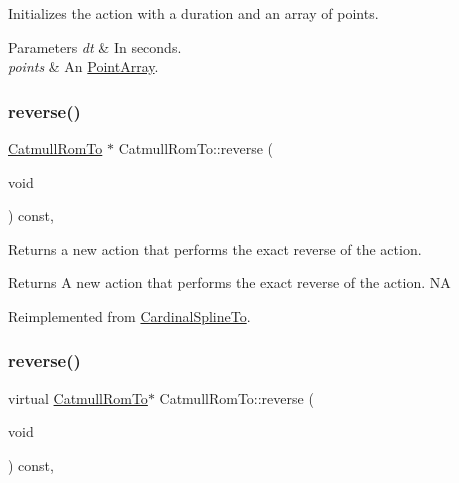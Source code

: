 Initializes the action with a duration and an array of points.


\begin{DoxyParams}{Parameters}
{\em dt} & In seconds. \\
\hline
{\em points} & An \hyperlink{classPointArray}{Point\+Array}. \\
\hline
\end{DoxyParams}
\mbox{\label{classCatmullRomTo_ac3a4e10bb0ce746fc0dc76d804482bc3}} 
\subsubsection{\texorpdfstring{reverse()}{reverse()}\hspace{0.1cm}{\footnotesize\ttfamily [1/2]}}
{\footnotesize\ttfamily \hyperlink{classCatmullRomTo}{Catmull\+Rom\+To} $\ast$ Catmull\+Rom\+To\+::reverse (\begin{DoxyParamCaption}\item[{void}]{ }\end{DoxyParamCaption}) const\hspace{0.3cm}{\ttfamily [override]}, {\ttfamily [virtual]}}

Returns a new action that performs the exact reverse of the action.

\begin{DoxyReturn}{Returns}
A new action that performs the exact reverse of the action.  NA 
\end{DoxyReturn}


Reimplemented from \hyperlink{classCardinalSplineTo_aecb2ad46af2d58995820c9dfc1f6459f}{Cardinal\+Spline\+To}.

\mbox{\label{classCatmullRomTo_a4657e8372500bbf9faa339cde93d1610}} 
\subsubsection{\texorpdfstring{reverse()}{reverse()}\hspace{0.1cm}{\footnotesize\ttfamily [2/2]}}
{\footnotesize\ttfamily virtual \hyperlink{classCatmullRomTo}{Catmull\+Rom\+To}$\ast$ Catmull\+Rom\+To\+::reverse (\begin{DoxyParamCaption}\item[{void}]{ }\end{DoxyParamCaption}) const\hspace{0.3cm}{\ttfamily [override]}, {\ttfamily [virtual]}}

